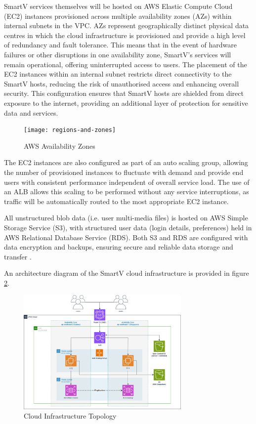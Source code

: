 SmartV services themselves will be hosted on AWS Elastic Compute Cloud (EC2) instances provisioned across multiple availability zones (AZs) within internal subnets in the VPC. AZs represent geographically distinct physical data centres in which the cloud infrastructure is provisioned and provide a high level of redundancy and fault tolerance. This means that in the event of hardware failures or other disruptions in one availability zone, SmartV's services will remain operational, offering uninterrupted access to users. The placement of the EC2 instances within an internal subnet restricts direct connectivity to the SmartV hosts, reducing the risk of unauthorised access and enhancing overall security. This configuration ensures that SmartV hosts are shielded from direct exposure to the internet, providing an additional layer of protection for sensitive data and services.

\begin{figure}[h]
    \centering
    \texttt{[image: regions-and-zones]}
    \caption{AWS Availability Zones \parencite{amazonwebservicesAWSRegionsAvailability}}
    \label{fig:availabilityzones}
\end{figure}

The EC2 instances are also configured as part of an auto scaling group, allowing the number of provisioned instances to fluctuate with demand and provide end users with consistent performance independent of overall service load. The use of an ALB allows this scaling to be performed without any service interruptions, as traffic will be automatically routed to the most appropriate EC2 instance.


All unstructured blob data (i.e. user multi-media files) is hosted on AWS Simple Storage Service (S3), with structured user data (login details, preferences) held in AWS Relational Database Service (RDS). Both S3 and RDS are configured with data encryption and backups, ensuring secure and reliable data storage and transfer \parencite{amazonwebservicesEncryptingAmazonRDS2023, amazonwebservicesProtectingDataEncryption}.

An architecture diagram of the SmartV cloud infrastructure is provided in figure \ref{fig:awsdiagram}.

\begin{figure}[h]
    \centering
    \includegraphics[width=0.75\textwidth]{cci_aws}
    \caption{Cloud Infrastructure Topology}
    \label{fig:awsdiagram}
\end{figure}


